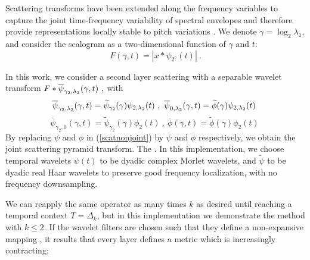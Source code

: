 %
%
%
%
Scattering transforms have been extended along the frequency
variables to capture the joint time-frequency 
variability of spectral envelopes and therefore provide 
 representations locally stable to pitch variations \cite{deepscatt}. 
We denote $\gamma = \log_2 \lambda_1$, and consider
the scalogram as a two-dimensional function of $\gamma$ and $t$: 
\[
F (\gamma, t) = |x \ast \psi_{2^{\gamma}} (t)|~.
\]

In this work, we consider a second layer scattering with 
a separable wavelet transform $F \ast \overline{\psi}_{\gamma_2, {\lambda}_2} (\gamma, t)~,$
with
$$\overline{\psi}_{{\gamma_2}, {{\lambda}_2}}(\gamma,t) = \widetilde{\psi}_{\gamma_2}(\gamma) \psi_{2,{\lambda}_2}(t)~,~\overline{\psi}_{{0}, {{\lambda}_2}}(\gamma,t) = \widetilde{\phi}(\gamma) \psi_{2,{\lambda}_2}(t)~$$
$$\overline{\psi}_{{\gamma_2}, {0}}(\gamma,t) = \widetilde{\psi}_{\gamma_2}(\gamma) \phi_{2}(t)~,~\overline{\phi}(\gamma,t) = \widetilde{\phi}(\gamma) \phi_{2}(t)~$$
By replacing $\psi$ and $\phi$ in (\ref{scatnonjoint}) by $\overline{\psi}$ and $\overline{\phi}$ respectively, we obtain the joint scattering pyramid transform.
The . 
In this implementation, 
we choose temporal wavelets $\psi(t)$ to be dyadic complex Morlet wavelets,
and $\widetilde{\psi}$ to be dyadic real Haar wavelets to preserve good frequency localization,
with no frequency downsampling. 

We can reapply the same operator as many times $k$ as desired until reaching a temporal 
context $T = \Delta_k$, but in this implementation we demonstrate the method with $k\leq 2$.
If the wavelet filters are chosen such that they define a non-expansive mapping \cite{pami}, it results that every layer defines a metric which is increasingly contracting:

